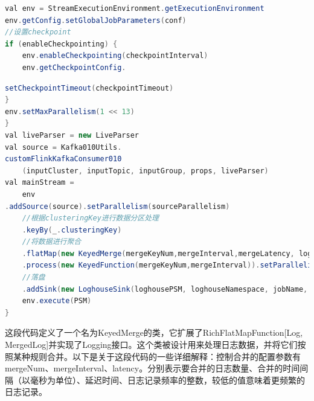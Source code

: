 \begin{longtable}[htbp]
\begin{lrbox}{\flinkshujuchulione}  
\begin{lstlisting}[language=Java]  
val env = StreamExecutionEnvironment.getExecutionEnvironment
env.getConfig.setGlobalJobParameters(conf)
//设置checkpoint
if (enableCheckpointing) {
    env.enableCheckpointing(checkpointInterval)
    env.getCheckpointConfig.
\end{lstlisting}  
\end{lrbox} 
\begin{table}[h]   
\caption{Flink数据处理代码逻辑}  
\label{tab:flinkshujuchuli}  
\usebox{\flinkshujuchulione}  
\end{table} 


\begin{lrbox}{\flinkshujuchulitwo}  
\begin{lstlisting}[language=Java]  
setCheckpointTimeout(checkpointTimeout)
}
env.setMaxParallelism(1 << 13)
}
val liveParser = new LiveParser
val source = Kafka010Utils.
customFlinkKafkaConsumer010
    (inputCluster, inputTopic, inputGroup, props, liveParser)
val mainStream =
    env
.addSource(source).setParallelism(sourceParallelism)
    //根据clusteringKey进行数据分区处理
    .keyBy(_.clusteringKey)
    //将数据进行聚合
    .flatMap(new KeyedMerge(mergeKeyNum,mergeInterval,mergeLatency, logRate)).setParallelism(combineParallelism)
    .process(new KeyedFunction(mergeKeyNum,mergeInterval)).setParallelism(combineParallelism)
    //落盘
    .addSink(new LoghouseSink(loghousePSM, loghouseNamespace, jobName, loghouseBatchSize, loghouseBatchInterval, enableBlackhole,enableBase64Encode)).setParallelism(sinkParallelism)
    env.execute(PSM)
}
\end{lstlisting}  
\end{lrbox} 


\begin{table}[h]   
 \vspace{-10pt}  %

\usebox{\flinkshujuchulitwo}  
\end{table}  

这段代码定义了一个名为KeyedMerge的类，它扩展了RichFlatMapFunction[Log, MergedLog]并实现了Logging接口。这个类被设计用来处理日志数据，并将它们按照某种规则合并。以下是关于这段代码的一些详细解释：控制合并的配置参数有mergeNum、mergeInterval、latency。分别表示要合并的日志数量、合并的时间间隔（以毫秒为单位）、延迟时间、日志记录频率的整数，较低的值意味着更频繁的日志记录。


\end{longtable}
